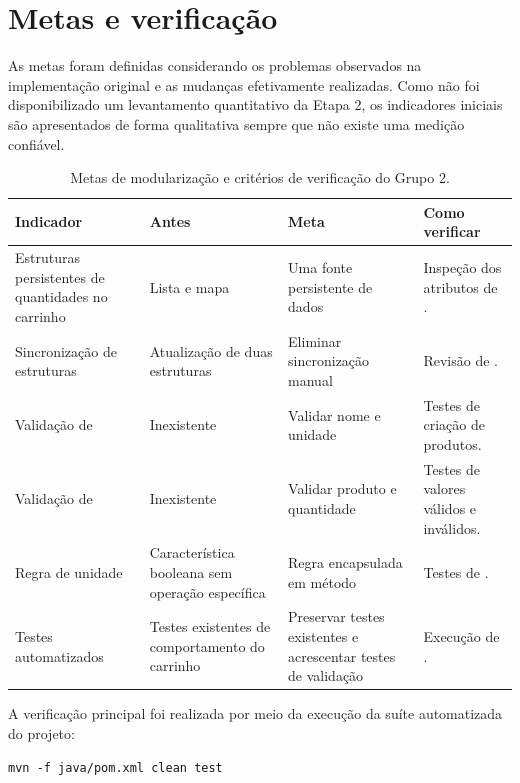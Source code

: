 \section{Metas e verificação}

As metas foram definidas considerando os problemas observados na implementação original e as mudanças efetivamente realizadas. Como não foi disponibilizado um levantamento quantitativo da Etapa 2, os indicadores iniciais são apresentados de forma qualitativa sempre que não existe uma medição confiável.

\begin{table}[H]\centering\small
\begin{tabularx}{\textwidth}{>{\raggedright\arraybackslash}p{4.3cm}>{\raggedright\arraybackslash}p{3.2cm}>{\raggedright\arraybackslash}p{3.0cm}Y}
\toprule
\textbf{Indicador} & \textbf{Antes} & \textbf{Meta} & \textbf{Como verificar} \\
\midrule
Estruturas persistentes de quantidades no carrinho & Lista e mapa & Uma fonte persistente de dados & Inspeção dos atributos de . \\
\addlinespace
Sincronização de estruturas & Atualização de duas estruturas & Eliminar sincronização manual & Revisão de . \\
\addlinespace
Validação de  & Inexistente & Validar nome e unidade & Testes de criação de produtos. \\
\addlinespace
Validação de  & Inexistente & Validar produto e quantidade & Testes de valores válidos e inválidos. \\
\addlinespace
Regra de unidade & Característica booleana sem operação específica & Regra encapsulada em método & Testes de . \\
\addlinespace
Testes automatizados & Testes existentes de comportamento do carrinho & Preservar testes existentes e acrescentar testes de validação & Execução de . \\
\bottomrule
\end{tabularx}
\caption{Metas de modularização e critérios de verificação do Grupo 2.}
\end{table}

A verificação principal foi realizada por meio da execução da suíte automatizada do projeto:

\begin{lstlisting}
mvn -f java/pom.xml clean test
\end{lstlisting}

